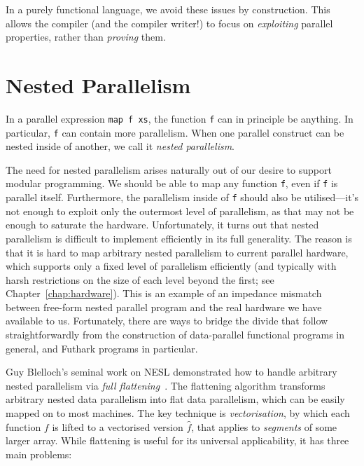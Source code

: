 In a purely functional language, we avoid these issues by
construction.  This allows the compiler (and the compiler writer!) to
focus on \textit{exploiting} parallel properties, rather than
\textit{proving} them.

\section{Nested Parallelism}
\label{sec:nested-parallelism}

In a parallel expression \lstinline{map f xs}, the function
\lstinline{f} can in principle be anything.  In particular,
\lstinline{f} can contain more parallelism.  When one parallel
construct can be nested inside of another, we call it \textit{nested
  parallelism}.

The need for nested parallelism arises naturally out of our desire to
support modular programming.  We should be able to map any function
\lstinline{f}, even if \lstinline{f} is parallel itself.  Furthermore,
the parallelism inside of \lstinline{f} should also be utilised---it's
not enough to exploit only the outermost level of parallelism, as that
may not be enough to saturate the hardware.  Unfortunately, it turns
out that nested parallelism is difficult to implement efficiently in
its full generality.  The reason is that it is hard to map arbitrary
nested parallelism to current parallel hardware, which supports only a
fixed level of parallelism efficiently (and typically with harsh
restrictions on the size of each level beyond the first; see
Chapter~\ref{chap:hardware}).  This is an example of an impedance
mismatch between free-form nested parallel program and the real
hardware we have available to us.  Fortunately, there are ways to
bridge the divide that follow straightforwardly from the construction
of data-parallel functional programs in general, and Futhark programs
in particular.

Guy Blelloch's seminal work on NESL demonstrated how to handle
arbitrary nested parallelism via \textit{full
  flattening}~\cite{blelloch1994implementation}.  The flattening
algorithm transforms arbitrary nested data parallelism into flat data
parallelism, which can be easily mapped on to most machines.  The key
technique is \textit{vectorisation}, by which each function $f$ is
lifted to a vectorised version $\hat{f}$, that applies to
\textit{segments} of some larger array.  While flattening is useful
for its universal applicability, it has three main problems:

